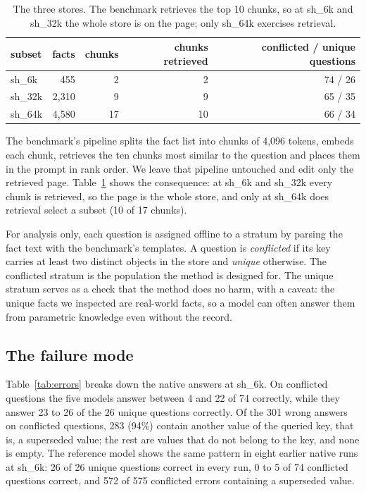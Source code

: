 \documentclass[journal=jcisd8,manuscript=article]{achemso}
\newcommand{\sub}[1]{\textsf{sh\_#1}}                    %
\begin{document}
\begin{table}[H]\centering
\caption{The three stores. The benchmark retrieves the top 10 chunks, so at \sub{6k} and \sub{32k} the whole store is on the page; only \sub{64k} exercises retrieval.}
\label{tab:stores}
\begin{tabular}{lrrrr}\toprule
subset & facts & chunks & chunks retrieved & conflicted / unique questions\\\midrule
\sub{6k}  & 455   & 2  & 2  & 74 / 26\\
\sub{32k} & 2,310 & 9  & 9  & 65 / 35\\
\sub{64k} & 4,580 & 17 & 10 & 66 / 34\\\bottomrule
\end{tabular}\end{table}

The benchmark's pipeline splits the fact list into chunks of 4,096 tokens, embeds each chunk, retrieves the ten chunks most similar to the question and places them in the prompt in rank order. We leave that pipeline untouched and edit only the retrieved page. Table~\ref{tab:stores} shows the consequence: at \sub{6k} and \sub{32k} every chunk is retrieved, so the page is the whole store, and only at \sub{64k} does retrieval select a subset (10 of 17 chunks).

For analysis only, each question is assigned offline to a stratum by parsing the fact text with the benchmark's templates. A question is \emph{conflicted} if its key carries at least two distinct objects in the store and \emph{unique} otherwise. The conflicted stratum is the population the method is designed for. The unique stratum serves as a check that the method does no harm, with a caveat: the unique facts we inspected are real-world facts, so a model can often answer them from parametric knowledge even without the record.

\subsection{The failure mode}
\label{sec:failure}

Table~\ref{tab:errors} breaks down the native answers at \sub{6k}. On conflicted questions the five models answer between 4 and 22 of 74 correctly, while they answer 23 to 26 of the 26 unique questions correctly. Of the 301 wrong answers on conflicted questions, 283 (94\%) contain another value of the queried key, that is, a superseded value; the rest are values that do not belong to the key, and none is empty. The reference model shows the same pattern in eight earlier native runs at \sub{6k}: 26 of 26 unique questions correct in every run, 0 to 5 of 74 conflicted questions correct, and 572 of 575 conflicted errors containing a superseded value.
\end{document}
